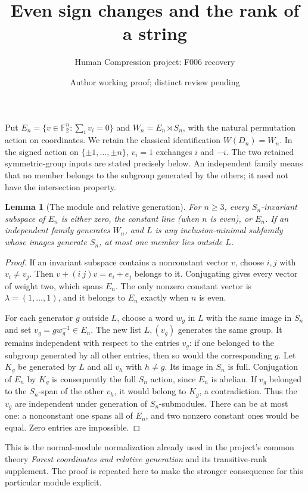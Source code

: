 \documentclass[11pt,a4paper]{article}
\title{Even sign changes and the rank of a string}
\author{Human Compression project: F006 recovery}
\date{Author working proof; distinct review pending}
\newtheorem{lemma}{Lemma}
\begin{document}
\maketitle
Put $E_n=\{v\in\mathbb F_2^n:\sum_i v_i=0\}$ and
$W_n=E_n\rtimes S_n$, with the natural permutation action on coordinates.
We retain the classical identification $W(D_n)=W_n$. In the signed action
on $\{\pm1,\ldots,\pm n\}$, $v_i=1$ exchanges $i$ and $-i$.
The two retained symmetric-group inputs are stated precisely below.
An independent family means that no member belongs to the subgroup
generated by the others; it need not have the intersection property.

\begin{lemma}[The module and relative generation]\label{module}
For $n\ge3$, every $S_n$-invariant subspace of $E_n$ is either zero,
the constant line (when $n$ is even), or $E_n$.
If an independent family generates $W_n$, and $L$ is any inclusion-minimal
subfamily whose images generate $S_n$, at most one member lies outside $L$.
\end{lemma}
\begin{proof}
If an invariant subspace contains a nonconstant vector $v$, choose
$i,j$ with $v_i\ne v_j$. Then $v+(i\ j)v=e_i+e_j$ belongs to it.
Conjugating gives every vector of weight two, which spans $E_n$.
The only nonzero constant vector is $\lambda=(1,\ldots,1)$, and
it belongs to $E_n$ exactly when $n$ is even.

For each generator $g$ outside $L$, choose a word $w_g$ in $L$
with the same image in $S_n$ and set $v_g=g w_g^{-1}\in E_n$.
The new list $L,(v_g)$ generates the same group. It remains independent
with respect to the entries $v_g$: if one belonged to the subgroup
generated by all other entries, then so would the corresponding $g$.
Let $K_g$ be generated by $L$ and all $v_h$ with $h\ne g$.
Its image in $S_n$ is full. Conjugation of $E_n$ by $K_g$ is consequently
the full $S_n$ action, since $E_n$ is abelian. If $v_g$ belonged to
the $S_n$-span of the other $v_h$, it would belong to $K_g$, a contradiction.
Thus the $v_g$ are independent under generation of $S_n$-submodules.
There can be at most one: a nonconstant one spans all of $E_n$, and
two nonzero constant ones would be equal. Zero entries are impossible.
\end{proof}

This is the normal-module normalization already used in the project's
common theory \emph{Forest coordinates and relative generation} and its
transitive-rank supplement. The proof is repeated here to make the
stronger consequence for this particular module explicit.
\end{document}
